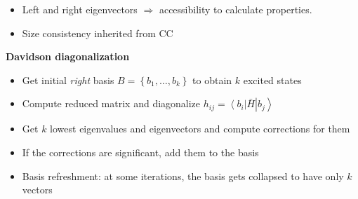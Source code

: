 \documentclass[a0paper,portrait]{baposter}
\begin{document}
\begin{poster}
{\begin{itemize}
    \item
      Left and right eigenvectors $ \Rightarrow $ accessibility to calculate
      properties.

    \item
      Size consistency inherited from CC

  \end{itemize}

  \textbf{Davidson diagonalization}
  \begin{itemize}

    \item
      Get initial \textit{right} basis
      $ B = \left \{ b_{1}, \ldots, b_{k} \right \} $
      to obtain $ k $ excited states

    \item
      Compute reduced matrix and diagonalize
      $
        h_{ij} =
        \left \langle b_{i} \right | \bar H \left | b_{j} \right \rangle
      $

    \item
      Get $ k $ lowest eigenvalues and eigenvectors and compute corrections
      for them

    \item
      If the corrections are significant, add them to the basis

    \item
      Basis refreshment: at some iterations, the basis gets collapsed
      to have only $ k $ vectors

  \end{itemize}




}








\end{poster}
\end{document}
